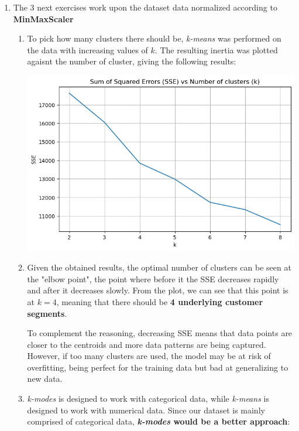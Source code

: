 \documentclass[12pt]{article}
\begin{document}
\begin{enumerate}[leftmargin=0pt, label=\textbf{\arabic*.)},start=1]
    \item The 3 next exercises work upon the dataset data normalized according to \textbf{MinMaxScaler}
          \begin{enumerate}[leftmargin=0pt, label=\textbf{\alph*.)}]
              \item To pick how many clusters there should be, \textit{k-means} was performed on the data with increasing values of $k$. The resulting inertia was plotted agaisnt the number of cluster, giving the following results:

                    \begin{center}
                        \includegraphics{sse_vs_k.png}
                    \end{center}

              \item Given the obtained results, the optimal number of clusters can be seen at the "elbow point", the point where before it the SSE decreases rapidly and after it decreases slowly. From the plot, we can see that this point is at $k=4$, meaning that there should be \textbf{4 underlying customer segments}.

                    To complement the reasoning, decreasing SSE means that data points are closer to the centroids and more data patterns are being captured. However, if too many clusters are used, the model may be at risk of overfitting, being perfect for the training data but bad at generalizing to new data.

              \item \textit{k-modes} is designed to work with categorical data, while \textit{k-means} is designed to work with numerical data. Since our dataset is mainly comprised of categorical data, \textbf{\textit{k-modes} would be a better approach}:


\end{enumerate}
\end{enumerate}
\end{document}
